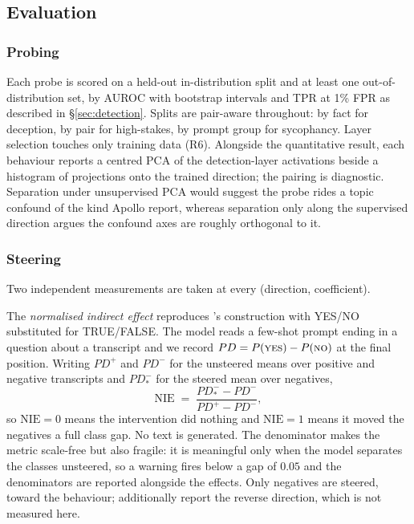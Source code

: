\documentclass[conference]{IEEEtran}
\begin{document}
\subsection{Evaluation}

\subsubsection{Probing}
Each probe is scored on a held-out in-distribution split and at least one
out-of-distribution set, by AUROC with bootstrap intervals and TPR at 1\% FPR as
described in §\ref{sec:detection}. Splits are pair-aware throughout: by fact
for deception, by pair for high-stakes, by prompt group for sycophancy. Layer
selection touches only training data (R6). Alongside the quantitative
result, each behaviour reports a centred PCA of the detection-layer activations
beside a histogram of projections onto the trained direction; the pairing is
diagnostic. Separation under unsupervised PCA would suggest the probe rides a topic
confound of the kind Apollo report, whereas separation only along the supervised
direction argues the confound axes are roughly orthogonal to it.

\subsubsection{Steering}
\label{sec:steereval}
Two independent measurements are taken at every (direction, coefficient).

The \emph{normalised indirect effect} reproduces \citeauthor{marks2024}'s
construction with YES/NO substituted for TRUE/FALSE. The model reads a few-shot
prompt ending in a question about a transcript and we record
$PD = P(\textsc{yes})-P(\textsc{no})$ at the final position. Writing $PD^{+}$ and
$PD^{-}$ for the unsteered means over positive and negative transcripts and
$PD^{-}_{*}$ for the steered mean over negatives,
\begin{equation}
\mathrm{NIE} \;=\; \frac{PD^{-}_{*} - PD^{-}}{PD^{+} - PD^{-}} ,
\label{eq:nie}
\end{equation}
so $\mathrm{NIE}=0$ means the intervention did nothing and $\mathrm{NIE}=1$ means
it moved the negatives a full class gap. No text is generated. The denominator
makes the metric scale-free but also fragile: it is meaningful only when the model
separates the classes unsteered, so a warning fires below a gap of $0.05$ and the
denominators are reported alongside the effects. Only negatives are steered,
toward the behaviour; \citeauthor{marks2024} additionally report the reverse
direction, which is not measured here.
\end{document}
